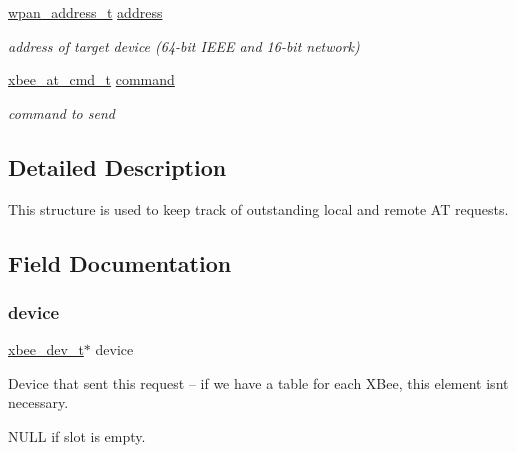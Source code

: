 \begin{DoxyCompactItemize}
\mbox{\label{structxbee__cmd__request__t_a66a58a737aee9733019399e2eceabf4a}} 
\hyperlink{structwpan__address__t}{wpan\+\_\+address\+\_\+t} \hyperlink{structxbee__cmd__request__t_a66a58a737aee9733019399e2eceabf4a}{address}
\begin{DoxyCompactList}\small\item\em address of target device (64-\/bit I\+E\+EE and 16-\/bit network) \end{DoxyCompactList}\item 
\mbox{\label{structxbee__cmd__request__t_aa1e66c60bb56acaced6ca2646fd44616}} 
\hyperlink{unionxbee__at__cmd__t}{xbee\+\_\+at\+\_\+cmd\+\_\+t} \hyperlink{structxbee__cmd__request__t_aa1e66c60bb56acaced6ca2646fd44616}{command}
\begin{DoxyCompactList}\small\item\em command to send \end{DoxyCompactList}\end{DoxyCompactItemize}


\subsection{Detailed Description}
This structure is used to keep track of outstanding local and remote AT requests. 

\subsection{Field Documentation}
\mbox{\label{structxbee__cmd__request__t_ac780e07a2b2cd8df18f56240588090c5}} 
\subsubsection{\texorpdfstring{device}{device}}
{\footnotesize\ttfamily \hyperlink{structxbee__dev__t}{xbee\+\_\+dev\+\_\+t}$\ast$ device}



Device that sent this request -- if we have a table for each X\+Bee, this element isn\textquotesingle{}t necessary. 

N\+U\+LL if slot is empty. \mbox{\label{structxbee__cmd__request__t_acb5c8866a58116314f6c8eda9dc3544c}} 
